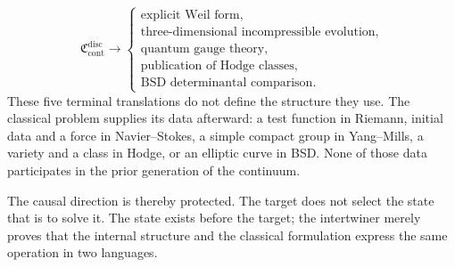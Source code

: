 \[
\mathfrak C_{\mathrm{cont}}^{\mathrm{disc}}
\longrightarrow
\begin{cases}
\text{explicit Weil form},\\
\text{three-dimensional incompressible evolution},\\
\text{quantum gauge theory},\\
\text{publication of Hodge classes},\\
\text{BSD determinantal comparison}.
\end{cases}
\]
These five terminal translations do not define the structure they use. The classical problem supplies its data afterward: a test function in Riemann, initial data and a force in Navier--Stokes, a simple compact group in Yang--Mills, a variety and a class in Hodge, or an elliptic curve in BSD. None of those data participates in the prior generation of the continuum.\par
The causal direction is thereby protected. The target does not select the state that is to solve it. The state exists before the target; the intertwiner merely proves that the internal structure and the classical formulation express the same operation in two languages.\par
{}
